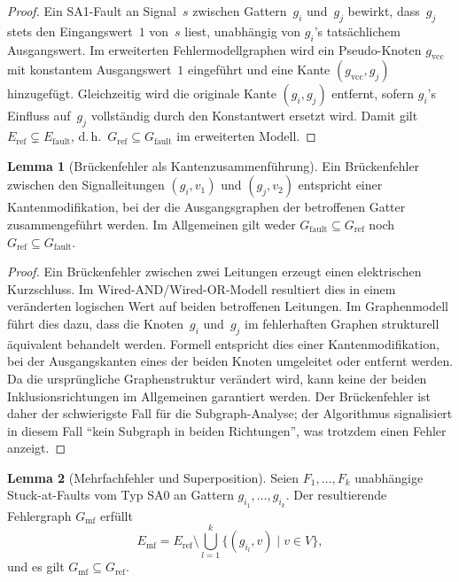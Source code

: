 ﻿\documentclass[a4paper,12pt]{article}
\theoremstyle{definition}
\newtheorem{lemma}{Lemma}
\begin{document}
\begin{proof}
  Ein SA1-Fault an Signal~$s$ zwischen Gattern~$g_i$ und~$g_j$ bewirkt,
  dass~$g_j$ stets den Eingangswert~$1$ von~$s$ liest, unabhängig von
  $g_i$'s tatsächlichem Ausgangswert.
  Im erweiterten Fehlermodellgraphen wird ein Pseudo-Knoten
  $g_{\mathrm{vcc}}$ mit konstantem Ausgangswert~$1$ eingeführt und
  eine Kante $(g_{\mathrm{vcc}}, g_j)$ hinzugefügt.
  Gleichzeitig wird die originale Kante $(g_i, g_j)$ entfernt, sofern
  $g_i$'s Einfluss auf~$g_j$ vollständig durch den Konstantwert ersetzt
  wird.
  Damit gilt $E_{\mathrm{ref}} \subsetneq E_{\mathrm{fault}}$, d.\,h.\
  $G_{\mathrm{ref}} \subseteq G_{\mathrm{fault}}$ im erweiterten Modell.
\end{proof}

\begin{lemma}[Brückenfehler als Kantenzusammenführung]
  \label{lem:bridge_edge}
  Ein Brückenfehler zwischen den Signalleitungen $(g_i, v_1)$ und
  $(g_j, v_2)$ entspricht einer Kantenmodifikation, bei der die
  Ausgangsgraphen der betroffenen Gatter zusammengeführt werden.
  Im Allgemeinen gilt weder $G_{\mathrm{fault}} \subseteq G_{\mathrm{ref}}$
  noch $G_{\mathrm{ref}} \subseteq G_{\mathrm{fault}}$.
\end{lemma}

\begin{proof}
  Ein Brückenfehler zwischen zwei Leitungen erzeugt einen elektrischen
  Kurzschluss.
  Im Wired-AND/Wired-OR-Modell resultiert dies in einem veränderten
  logischen Wert auf beiden betroffenen Leitungen.
  Im Graphenmodell führt dies dazu, dass die Knoten~$g_i$ und~$g_j$
  im fehlerhaften Graphen strukturell äquivalent behandelt werden.
  Formell entspricht dies einer Kantenmodifikation, bei der
  Ausgangskanten eines der beiden Knoten umgeleitet oder entfernt werden.
  Da die ursprüngliche Graphenstruktur verändert wird, kann keine der
  beiden Inklusionsrichtungen im Allgemeinen garantiert werden.
  Der Brückenfehler ist daher der schwierigste Fall für die
  Subgraph-Analyse; der Algorithmus signalisiert in diesem Fall
  ``kein Subgraph in beiden Richtungen'', was trotzdem einen Fehler
  anzeigt.
\end{proof}

\begin{lemma}[Mehrfachfehler und Superposition]
  \label{lem:mehrfach}
  Seien $F_1, \ldots, F_k$ unabhängige Stuck-at-Faults vom Typ SA0 an
  Gattern $g_{i_1}, \ldots, g_{i_k}$.
  Der resultierende Fehler\-graph $G_{\mathrm{mf}}$ erfüllt
  \[
    E_{\mathrm{mf}}
    = E_{\mathrm{ref}}
      \setminus \bigcup_{l=1}^{k} \{(g_{i_l}, v) \mid v \in V\},
  \]
  und es gilt $G_{\mathrm{mf}} \subseteq G_{\mathrm{ref}}$.
\end{lemma}
\end{document}
